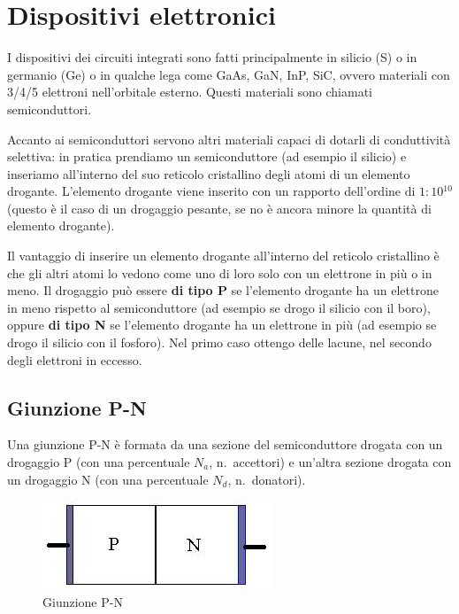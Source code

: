 \documentclass[
]{book}
\author{}
\date{}
\begin{document}
\frontmatter

{
\setcounter{tocdepth}{2}
\tableofcontents
}
\mainmatter
\newpage

\chapter{Dispositivi elettronici}\label{dispositivi-elettronici}

I dispositivi dei circuiti integrati sono fatti principalmente in
silicio (S) o in germanio (Ge) o in qualche lega come GaAs, GaN, InP,
SiC, ovvero materiali con 3/4/5 elettroni nell'orbitale esterno. Questi
materiali sono chiamati semiconduttori.

Accanto ai semiconduttori servono altri materiali capaci di dotarli di
conduttività selettiva: in pratica prendiamo un semiconduttore (ad
esempio il silicio) e inseriamo all'interno del suo reticolo cristallino
degli atomi di un elemento drogante. L'elemento drogante viene inserito
con un rapporto dell'ordine di \(1:10{}^{10}\) (questo è il caso di un
drogaggio pesante, se no è ancora minore la quantità di elemento
drogante).

Il vantaggio di inserire un elemento drogante all'interno del reticolo
cristallino è che gli altri atomi lo vedono come uno di loro solo con un
elettrone in più o in meno. Il drogaggio può essere \textbf{di tipo P}
se l'elemento drogante ha un elettrone in meno rispetto al
semiconduttore (ad esempio se drogo il silicio con il boro), oppure
\textbf{di tipo N} se l'elemento drogante ha un elettrone in più (ad
esempio se drogo il silicio con il fosforo). Nel primo caso ottengo
delle lacune, nel secondo degli elettroni in eccesso.

\section{Giunzione P-N}\label{giunzione-p-n}

Una giunzione P-N è formata da una sezione del semiconduttore drogata
con un drogaggio P (con una percentuale \(N_{a}\), n.~accettori) e
un'altra sezione drogata con un drogaggio N (con una percentuale
\(N_{d}\), n.~donatori).

\begin{figure}
\centering
\includegraphics[width=\linewidth,height=0.05\textheight,keepaspectratio]{immagini/0.jpg}
\caption{Giunzione P-N}
\end{figure}
\end{document}
